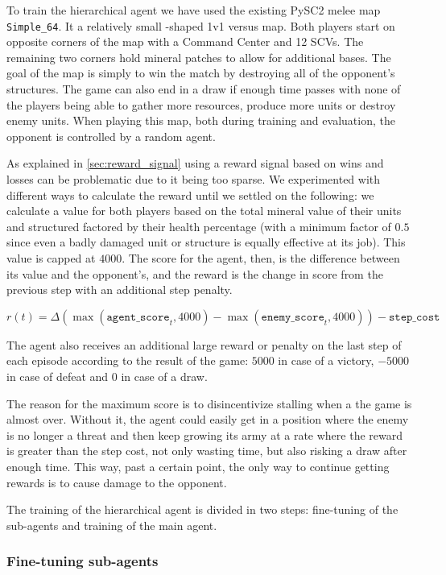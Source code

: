 To train the hierarchical agent we have used the existing PySC2 melee map \texttt{Simple\_64}. It a relatively small -shaped 1v1 versus map. Both players start on opposite corners of the map with a Command Center and 12 SCVs. The remaining two corners hold mineral patches to allow for additional bases. The goal of the map is simply to win the match by destroying all of the opponent's structures. The game can also end in a draw if enough time passes with none of the players being able to gather more resources, produce more units or destroy enemy units. When playing this map, both during training and evaluation, the opponent is controlled by a random agent.

As explained in \ref{sec:reward_signal} using a reward signal based on wins and losses can be problematic due to it being too sparse. We experimented with different ways to calculate the reward until we settled on the following: we calculate a value for both players based on the total mineral value of their units and structured factored by their health percentage (with a minimum factor of $0.5$ since even a badly damaged unit or structure is equally effective at its job). This value is capped at $4000$. The score for the agent, then, is the difference between its value and the opponent's, and the reward is the change in score from the previous step with an additional step penalty.

$$
r(t) = \Delta(\max(\texttt{agent\_score}_{t}, 4000) - \max(\texttt{enemy\_score}_{t}, 4000)) - \texttt{step\_cost}
$$

The agent also receives an additional large reward or penalty on the last step of each episode according to the result of the game: $5000$ in case of a victory, $-5000$ in case of defeat and $0$ in case of a draw.

The reason for the maximum score is to disincentivize stalling when a the game is almost over. Without it, the agent could easily get in a position where the enemy is no longer a threat and then keep growing its army at a rate where the reward is greater than the step cost, not only wasting time, but also risking a draw after enough time. This way, past a certain point, the only way to continue getting rewards is to cause damage to the opponent.

The training of the hierarchical agent is divided in two steps: fine-tuning of the sub-agents and training of the main agent.

\subsubsection*{Fine-tuning sub-agents}

